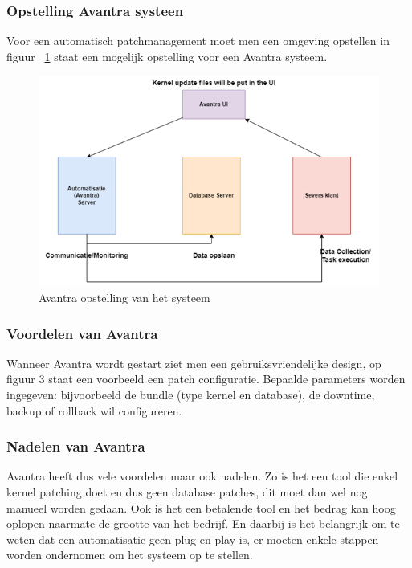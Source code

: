 \subsubsection{Opstelling Avantra systeen}
Voor een automatisch patchmanagement moet men een omgeving opstellen in figuur ~\ref{fig:avantra4} staat een mogelijk opstelling voor een Avantra systeem. 
\begin{figure}[htbp]
    \centering
    \includegraphics[width=\textwidth]{avantra4.png}
    \caption{Avantra opstelling van het systeem}
     \label{fig:avantra4}
\end{figure}

\subsubsection{Voordelen van Avantra}
Wanneer Avantra wordt gestart ziet men een gebruiksvriendelijke design, op figuur 3 staat een voorbeeld een patch configuratie. Bepaalde parameters worden ingegeven: bijvoorbeeld de bundle (type kernel en database), de downtime, backup of 
 rollback wil configureren. \\ 

\subsubsection{Nadelen van Avantra}
Avantra heeft dus vele voordelen maar ook nadelen. Zo is het een tool die enkel kernel patching doet en dus geen database patches, dit moet dan wel nog manueel worden gedaan. Ook is het een betalende tool en het bedrag kan hoog oplopen naarmate de grootte van het bedrijf.
En daarbij is het belangrijk om te weten dat een automatisatie geen plug en play is, er moeten enkele stappen worden ondernomen om het systeem op te stellen.

